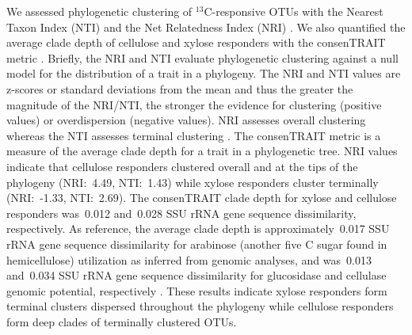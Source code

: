We assessed phylogenetic clustering of $^{13}$C-responsive OTUs with the
Nearest Taxon Index (NTI) and the Net Relatedness Index (NRI)
\citep{Webb2000}. We also quantified the average clade depth of cellulose and
xylose responders with the consenTRAIT metric \citep{Martiny2013}. Briefly, the
NRI and NTI evaluate phylogenetic clustering against a null model for the
distribution of a trait in a phylogeny. The NRI and NTI values are z-scores or
standard deviations from the mean and thus the greater the magnitude of the
NRI/NTI, the stronger the evidence for clustering (positive values) or
overdispersion (negative values). NRI assesses overall clustering whereas the
NTI assesses terminal clustering \citep{Evans2014a}. The consenTRAIT metric is
a measure of the average clade depth for a trait in a phylogenetic tree. NRI
values indicate that cellulose responders clustered overall and at the tips of
the phylogeny (NRI:~4.49, NTI:~1.43) while xylose responders cluster terminally
(NRI:~-1.33, NTI:~2.69). The consenTRAIT clade depth for xylose and cellulose
responders was~0.012 and~0.028 SSU rRNA gene sequence dissimilarity,
respectively. As reference, the average clade depth is approximately~0.017 SSU
rRNA gene sequence dissimilarity for arabinose (another five C sugar found in
hemicellulose) utilization as inferred from genomic analyses, and was~0.013
and~0.034 SSU rRNA gene sequence dissimilarity for glucosidase and cellulase
genomic potential, respectively \citep{Martiny2013,Berlemont2013}. These
results indicate xylose responders form terminal clusters dispersed throughout
the phylogeny while cellulose responders form deep clades of terminally
clustered OTUs.
